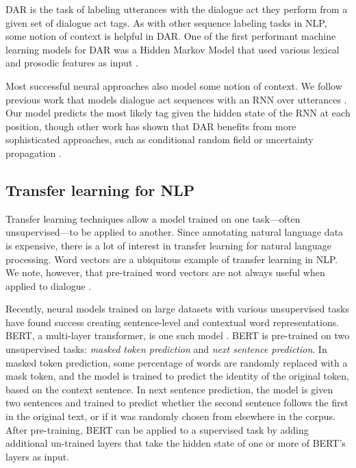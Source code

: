 \documentclass[11pt,a4paper]{article}
\begin{document}
DAR is the task of labeling utterances with the dialogue act they perform from a given set of dialogue act tags.
As with other sequence labeling tasks in NLP, some notion of context is helpful in DAR.
One of the first performant machine learning models for DAR was a Hidden Markov Model that used various lexical and prosodic features as input \citep{stolckeDialogueActModeling2000}.

Most successful neural approaches also model some notion of context.
We follow previous work that models dialogue act sequences with an RNN over utterances \citep{kalchbrennerRecurrentConvolutionalNeural2013,tranHierarchicalNeuralModel2017,botheContextbasedApproachDialogue2018,bothe2018conversational,zhao2018unified}.
Our model predicts the most likely tag given the hidden state of the RNN at each position, though other work has shown that DAR benefits from more sophisticated approaches, such as conditional random field \citep{chenDialogueActRecognition2017} or uncertainty propagation \citep{tranPreservingDistributionalInformation2017}.


\subsection{Transfer learning for NLP}
Transfer learning techniques allow a model trained on one task---often unsupervised---to be applied to another. 
Since annotating natural language data is expensive, there is a lot of interest in transfer learning for natural language processing. 
Word vectors \citep[e.g.,][]{mikolovDistributedRepresentationsWords2013,penningtonGloveGlobalVectors2014} are a ubiquitous example of transfer learning in NLP.
We note, however, that pre-trained word vectors are not always useful when applied to dialogue \cite{cerisaraEffectsUsingWord2vec2017}. 

Recently, neural models trained on large datasets with various unsupervised tasks have found success creating sentence-level and contextual word representations. 
BERT, a multi-layer transformer, is one such model \citep{devlinBERTPretrainingDeep2018}. 
BERT is pre-trained on two unsupervised tasks: \emph{masked token prediction} and \emph{next sentence prediction}.
In masked token prediction, some percentage of words are randomly replaced with a mask token, and the model is trained to predict the identity of the original token, based on the context sentence.
In next sentence prediction, the model is given two sentences and trained to predict whether the second sentence follows the first in the original text, or if it was randomly chosen from elsewhere in the corpus.
After pre-training, BERT can be applied to a supervised task by adding additional un-trained layers that take the hidden state of one or more of BERT's layers as input. 
\end{document}
